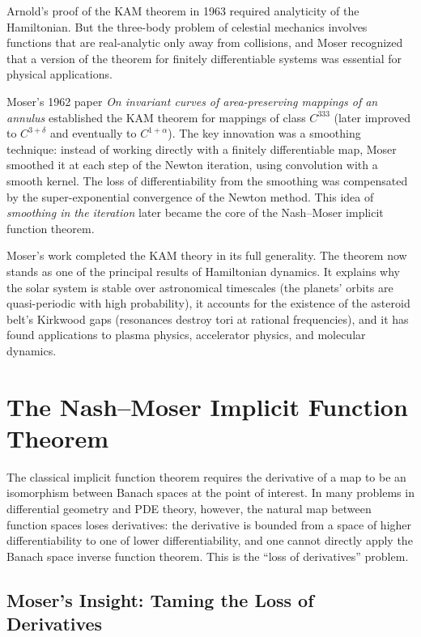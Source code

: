 Arnold's proof of the KAM theorem in 1963 required analyticity of the Hamiltonian. But the three-body problem of celestial mechanics involves functions that are real-analytic only away from collisions, and Moser recognized that a version of the theorem for finitely differentiable systems was essential for physical applications.

Moser's 1962 paper \textit{On invariant curves of area-preserving mappings of an annulus} established the KAM theorem for mappings of class $C^{333}$ (later improved to $C^{3+\delta}$ and eventually to $C^{1+\alpha}$). The key innovation was a smoothing technique: instead of working directly with a finitely differentiable map, Moser smoothed it at each step of the Newton iteration, using convolution with a smooth kernel. The loss of differentiability from the smoothing was compensated by the super-exponential convergence of the Newton method. This idea of \textit{smoothing in the iteration} later became the core of the Nash--Moser implicit function theorem.

Moser's work completed the KAM theory in its full generality. The theorem now stands as one of the principal results of Hamiltonian dynamics. It explains why the solar system is stable over astronomical timescales (the planets' orbits are quasi-periodic with high probability), it accounts for the existence of the asteroid belt's Kirkwood gaps (resonances destroy tori at rational frequencies), and it has found applications to plasma physics, accelerator physics, and molecular dynamics.

\section{The Nash--Moser Implicit Function Theorem}

The classical implicit function theorem requires the derivative of a map to be an isomorphism between Banach spaces at the point of interest. In many problems in differential geometry and PDE theory, however, the natural map between function spaces loses derivatives: the derivative is bounded from a space of higher differentiability to one of lower differentiability, and one cannot directly apply the Banach space inverse function theorem. This is the ``loss of derivatives'' problem.

\subsection{Moser's Insight: Taming the Loss of Derivatives}

